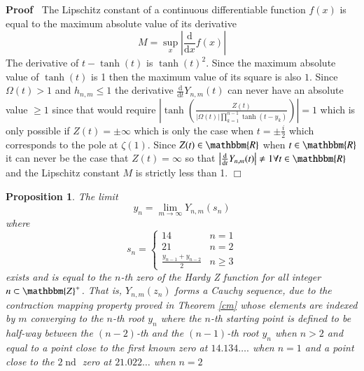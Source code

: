 \documentclass{elsarticle}
\newcommand{\mathd}{\mathrm{d}}
\newcommand{\tmop}[1]{\ensuremath{\operatorname{#1}}}
\newenvironment{proof}{\noindent\textbf{Proof\ }}{\hspace*{\fill}$\Box$\medskip}
\newtheorem{proposition}{Proposition}
{\theorembodyfont{\rmfamily}\newtheorem{remark}{Remark}}
\begin{document}
\begin{proof}
  The Lipschitz constant of a continuous differentiable function $f (x)$ is
  equal to the maximum absolute value of its derivative
  \begin{equation}
    M = \sup_x \left| \frac{\mathd}{\mathd x} f (x) \right|
  \end{equation}
  The derivative of $t - \tanh (t)$ is $\tanh (t)^2$. Since the maximum
  absolute value of $\tanh (t)$ is 1 then the maximum value of its square is
  also $1$. Since $\Omega (t) > 1$ and $h_{n, m} \leqslant 1$ the derivative
  $\frac{\mathd}{\mathd t} Y_{n, m} (t)$ can never have an absolute value
  $\geqslant 1$ since that would require $\left| \tanh \left( \frac{Z (t)}{|
  \Omega (t) | \prod_{k = 1}^{n - 1} \tanh (t - y_k)} \right) \right| = 1$
  which is only possible if $Z (t) = \pm \infty$ which is only the case when
  $t = \pm \frac{i}{2}$ which corresponds to the pole at $\zeta (1)$. Since $Z
  (t) \in \mathbbm{R}$ when $t \in \mathbbm{R}$ it can never be the case that
  $Z (t) = \infty$ so that $\left| \frac{\mathd}{\mathd t} Y_{n, m} (t)
  \right| \neq 1 \forall t \in \mathbbm{R}$ and the Lipschitz constant $M$ is
  strictly less than 1.
\end{proof}

\begin{proposition}
  \label{p1}The limit
  \begin{equation}
    y_n = \lim_{m \rightarrow \infty} Y_{n, m} (s_n)
  \end{equation}
  where
  \begin{equation}
    s_n = \left\{ \begin{array}{ll}
      14 & n = 1\\
      21 & n = 2\\
      \frac{y_{n - 1} + y_{n - 2}}{2} & n \geqslant 3
    \end{array} \right.
  \end{equation}
  exists and is equal to the $n$-th zero of the Hardy Z function for all
  integer $n \subset \mathbbm{Z}^+$. That is, $Y_{n, m} (z_n)$ forms a Cauchy
  sequence, due to the contraction mapping property proved in Theorem \ref{cm}
  whose elements are indexed by $m$ converging to the $n$-th root $y_n$ where
  the $n$-th starting point is defined to be half-way between the $(n - 2)$-th
  and the $(n - 1)$-th root $y_n$ when $n > 2$ and equal to a point close to
  the first known zero at $14.134 \ldots .$ when $n = 1$ and a point close to
  the $2 \tmop{nd}$ zero at $21.022 \ldots$ when $n = 2$
\end{proposition}
\end{document}
